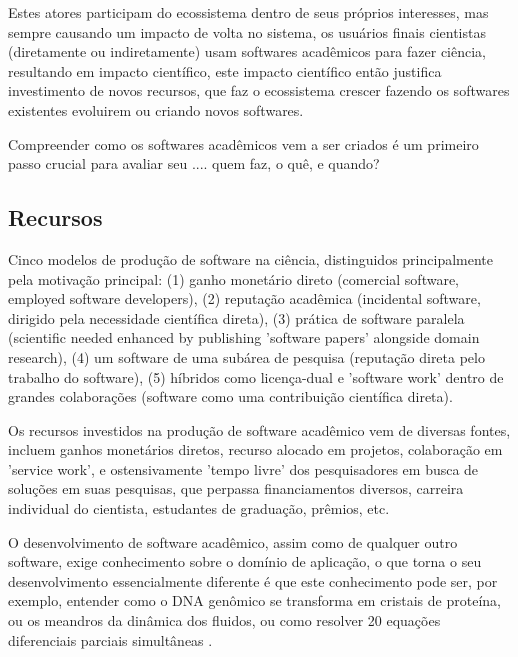 Estes atores participam do ecossistema dentro de seus próprios interesses, mas
sempre causando um impacto de volta no sistema, os usuários finais cientistas
(diretamente ou indiretamente) usam softwares acadêmicos para fazer ciência,
resultando em impacto científico, este impacto científico então justifica
investimento de novos recursos, que faz o ecossistema crescer fazendo os softwares
existentes evoluirem ou criando novos softwares.

%

Compreender como os softwares acadêmicos vem a ser criados é um primeiro
passo crucial para avaliar seu .... quem faz, o quê, e quando?

\subsection{Recursos}

Cinco modelos de produção de software na ciência, distinguidos principalmente
pela motivação principal: (1) ganho monetário direto (comercial software,
employed software developers), (2) reputação acadêmica (incidental software,
dirigido pela necessidade científica direta), (3) prática de software paralela
(scientific needed enhanced by publishing 'software papers' alongside domain research),
(4) um software de uma subárea de pesquisa (reputação direta pelo trabalho do software),
(5) híbridos como licença-dual e 'software work' dentro de grandes colaborações
(software como uma contribuição científica direta).

Os recursos investidos na produção de software acadêmico vem de diversas
fontes, incluem ganhos monetários diretos, recurso alocado em projetos,
colaboração em 'service work', e ostensivamente 'tempo livre' dos pesquisadores
em busca de soluções em suas pesquisas, que perpassa financiamentos diversos,
carreira individual do cientista, estudantes de graduação, prêmios, etc.

O desenvolvimento de software acadêmico, assim como de qualquer outro
software, exige conhecimento sobre o domínio de aplicação, o que torna o
seu desenvolvimento essencialmente diferente é que este conhecimento pode ser,
por exemplo, entender como o DNA genômico se transforma em cristais de
proteína, ou os meandros da dinâmica dos fluidos, ou como resolver 20 equações
diferenciais parciais simultâneas \cite{segal2008developing}.

